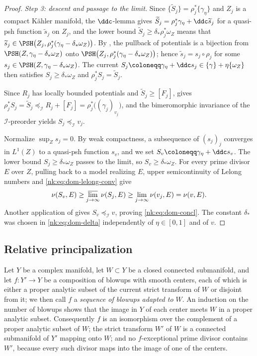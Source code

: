 \begin{proof}
\emph{Step 3: descent and passage to the limit.}
Since $\{\widetilde S_j\}=\rho_j^*\{\gamma_\eta\}$ and $Z_j$ is a
compact K\"ahler manifold, the $\ddc$-lemma gives
$\widetilde S_j=\rho_j^*\gamma_\eta+\ddc\widetilde s_j$ for a quasi-psh
function $\widetilde s_j$ on $Z_j$, and the lower bound
$\widetilde S_j\ge\delta_*\rho_j^*\omega_Z$ means that
$\widetilde s_j\in
\PSH\bigl(Z_j,\rho_j^*(\gamma_\eta-\delta_*\omega_Z)\bigr)$. By
\cite[Proposition~1.5.3]{SGPT}, the pullback of potentials is a
bijection from $\PSH(Z,\gamma_\eta-\delta_*\omega_Z)$ onto
$\PSH\bigl(Z_j,\rho_j^*(\gamma_\eta-\delta_*\omega_Z)\bigr)$; hence
$\widetilde s_j=s_j\circ\rho_j$ for some
$s_j\in\PSH(Z,\gamma_\eta-\delta_*\omega_Z)$. The current
$S_j\coloneqq \gamma_\eta+\ddc s_j\in\{\gamma\}+\eta\{\omega_Z\}$ then
satisfies
$S_j\ge\delta_*\omega_Z$ and $\rho_j^*S_j=\widetilde S_j$.

Since $R_j$ has locally bounded potentials and
$\widetilde S_j\ge[F_j]$, \cite[Proposition~6.1.2]{SGPT} gives
$\rho_j^*S_j=\widetilde S_j
\preceq_{\mathcal I} R_j+[F_j]=\rho_j^*\bigl((\gamma_j)_{v_j}\bigr)$, and the
bimeromorphic invariance of the $\mathcal I$-preorder
\cite[Lemma~6.1.4]{SGPT} yields $S_j\preceq_{\mathcal I} v_j$.

Normalize $\sup_Zs_j=0$. By weak compactness, a subsequence of
$(s_j)_j$ converges in $L^1(Z)$ to a quasi-psh function $s_v$, and
we set $S_v\coloneqq \gamma_\eta+\ddc s_v$. The lower bound
$S_j\ge\delta_*\omega_Z$ passes to the limit, so
$S_v\ge\delta_*\omega_Z$. For every prime divisor $E$ over $Z$,
pulling back to a model realizing $E$, upper semicontinuity of
Lelong numbers and \eqref{nk:eq:dom-lelong-conv} give
\[
  \nu(S_v,E)\ge\varlimsup_{j\to\infty}\nu(S_j,E)
  \ge\lim_{j\to\infty}\nu(v_j,E)=\nu(v,E).
\]
Another application of \cite[Proposition~6.1.2]{SGPT} gives
$S_v\preceq_{\mathcal I} v$, proving \eqref{nk:eq:dom-concl}. The constant $\delta_*$ was chosen in
\eqref{nk:eq:dom-delta} independently of $\eta\in[0,1]$ and of $v$.
\end{proof}



\subsection{Relative principalization}

Let $Y$ be a complex manifold, let $W\subset Y$ be a closed connected
submanifold, and let $f\colon Y'\to Y$ be a composition of blowups with
smooth centers, each of which is either a proper analytic subset of the
current strict transform of $W$ or disjoint from it; we then call $f$
a \emph{sequence of blowups adapted to $W$}. An induction on the
number of blowups shows that the image in $Y$ of each center meets
$W$ in a proper analytic subset. Consequently $f$ is an isomorphism
over the complement of a proper analytic subset of $W$; the strict
transform $W'$ of $W$ is a connected submanifold of $Y'$ mapping
onto $W$; and no $f$-exceptional prime divisor contains $W'$,
because every such divisor maps into the image of one of the centers.

